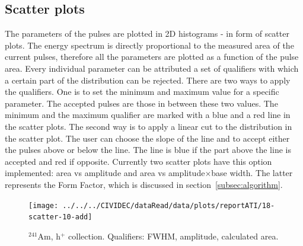 \subsection{Scatter plots}
The parameters of the pulses are plotted in 2D histograms - in form of scatter plots. The energy spectrum is directly proportional to the measured area of the current pulses, therefore all the parameters are plotted as a function of the pulse area. 
Every individual parameter can be attributed a set of qualifiers with which a certain part of the distribution can be rejected. There are two ways to apply the qualifiers. One is to set the minimum and maximum value for a specific parameter. The accepted pulses are those in between these two values. The minimum and the maximum qualifier are marked with a blue and a red line in the scatter plots. The second way is to apply a linear cut to the distribution in the scatter plot. The user can choose the slope of the line and to accept either the pulses above or below the line. The line is blue if the part above the line is accepted and red if opposite. Currently two scatter plots have this option implemented: area vs amplitude and area vs amplitude$\times$base width. The latter represents the Form Factor, which is discussed in section~\ref{subsec:algorithm}.



 

\clearpage
\begin{figure}[!t]
\centering
\texttt{[image: ../../../CIVIDEC/dataRead/data/plots/reportATI/18-scatter-10-add]}
\caption{$^{241}$Am, h$^{+}$ collection. Qualifiers: FWHM, amplitude, calculated area.}
\label{fig:scatterah}
\end{figure}

